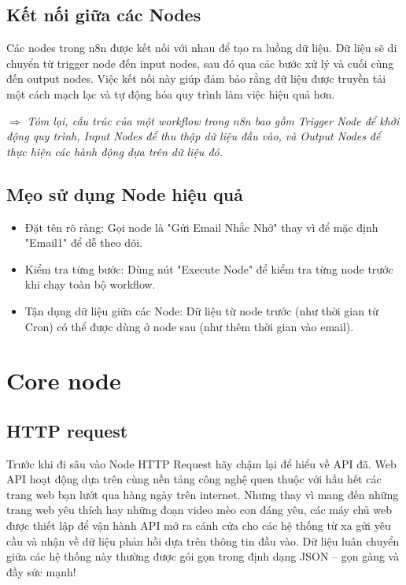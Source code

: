 \subsection{Kết nối giữa các Nodes}

Các nodes trong n8n được kết nối với nhau để tạo ra luồng dữ liệu. Dữ liệu sẽ di chuyển từ trigger node đến input nodes, sau đó qua các bước xử lý và cuối cùng đến output nodes. Việc kết nối này giúp đảm bảo rằng dữ liệu được truyền tải một cách mạch lạc và tự động hóa quy trình làm việc hiệu quả hơn.

$\Rightarrow$ \textit{Tóm lại, cấu trúc của một workflow trong n8n bao gồm Trigger Node để khởi động quy trình, Input Nodes để thu thập dữ liệu đầu vào, và Output Nodes để thực hiện các hành động dựa trên dữ liệu đó.}


\subsection{Mẹo sử dụng Node hiệu quả}

\begin{itemize}
    \item Đặt tên rõ ràng: Gọi node là "Gửi Email Nhắc Nhở" thay vì để mặc định "Email1" để dễ theo dõi.
    \item Kiểm tra từng bước: Dùng nút "Execute Node" để kiểm tra từng node trước khi chạy toàn bộ workflow.
    \item Tận dụng dữ liệu giữa các Node: Dữ liệu từ node trước (như thời gian từ Cron) có thể được dùng ở node sau (như thêm thời gian vào email).
\end{itemize}


\section{Core node}

\subsection{HTTP request}
Trước khi đi sâu vào Node HTTP Request hãy chậm lại để hiểu về API đã. Web API hoạt động dựa trên cùng nền tảng công nghệ quen thuộc với hầu hết các trang web bạn lướt qua hàng ngày trên internet. Nhưng thay vì mang đến những trang web yêu thích hay những đoạn video mèo con đáng yêu, các máy chủ web được thiết lập để vận hành API mở ra cánh cửa cho các hệ thống từ xa gửi yêu cầu và nhận về dữ liệu phản hồi dựa trên thông tin đầu vào. Dữ liệu luân chuyển giữa các hệ thống này thường được gói gọn trong định dạng JSON – gọn gàng và đầy sức mạnh!


